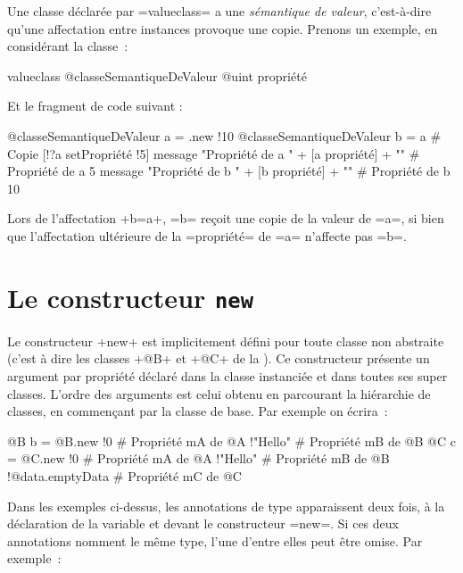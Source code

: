 
Une classe déclarée par \ggst=valueclass= a une \emph{sémantique de valeur}, c'est-à-dire qu'une affectation entre instances provoque une copie. Prenons un exemple, en considérant la classe~:

\begin{galgas3}
valueclass @classeSemantiqueDeValeur {
  @uint propriété
}
\end{galgas3}

Et le fragment de code suivant :

\begin{galgas3}
@classeSemantiqueDeValeur a = .new {!10}
@classeSemantiqueDeValeur b = a # Copie
[!?a setPropriété !5]
message "Propriété de a " + [a propriété] + "\n" # Propriété de a 5
message "Propriété de b " + [b propriété] + "\n" # Propriété de b 10
\end{galgas3}

Lors de l'affectation \ggst+b=a+, \ggst=b= reçoit une copie de la valeur de \ggst=a=, si bien que l'affectation ultérieure de la \ggst=propriété= de \ggst=a= n'affecte pas \ggst=b=.








\section{Le constructeur \texttt{new}}

Le constructeur \ggst+new+ est implicitement défini pour toute classe non abstraite (c'est à dire les classes \ggst+@B+ et \ggst+@C+ de la ). Ce constructeur présente un argument par propriété déclaré dans la classe instanciée et dans toutes ses super classes. L'ordre des arguments est celui obtenu en parcourant la hiérarchie de classes, en commençant par la classe de base. Par exemple on écrira~:

\begin{galgas3}
@B b = @B.new {
  !0 # Propriété mA de @A
  !"Hello" # Propriété mB de @B
}
@C c = @C.new {
  !0 # Propriété mA de @A
  !"Hello" # Propriété mB de @B
  !@data.emptyData # Propriété mC de @C
}
\end{galgas3}

Dans les exemples ci-dessus, les annotations de type apparaissent deux fois, à la déclaration de la variable et devant le constructeur \ggst=new=. Si ces deux annotations nomment le même type, l'une d'entre elles peut être omise. Par exemple~:

